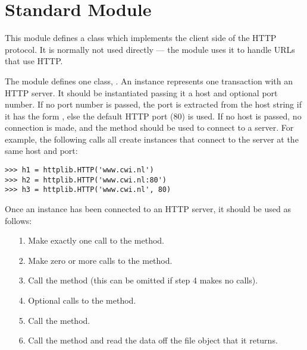 \section{Standard Module }
\label{module-httplib}

\renewcommand{\indexsubitem}{(in module httplib)}

This module defines a class which implements the client side of the
HTTP protocol.  It is normally not used directly --- the module
 uses it to handle URLs that use HTTP.

The module defines one class, .  An  instance
represents one transaction with an HTTP server.  It should be
instantiated passing it a host and optional port number.  If no port
number is passed, the port is extracted from the host string if it has
the form , else the default HTTP port (80) is used.
If no host is passed, no connection is made, and the 
method should be used to connect to a server.  For example, the
following calls all create instances that connect to the server at the
same host and port:

\bcode\begin{verbatim}
>>> h1 = httplib.HTTP('www.cwi.nl')
>>> h2 = httplib.HTTP('www.cwi.nl:80')
>>> h3 = httplib.HTTP('www.cwi.nl', 80)
\end{verbatim}\ecode
%
Once an  instance has been connected to an HTTP server, it
should be used as follows:

\begin{enumerate}

\item[1.] Make exactly one call to the  method.

\item[2.] Make zero or more calls to the  method.

\item[3.] Call the  method (this can be omitted if
step 4 makes no calls).

\item[4.] Optional calls to the  method.

\item[5.] Call the  method.

\item[6.] Call the  method and read the data off the
file object that it returns.

\end{enumerate}

